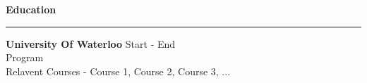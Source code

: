 

\textbf{Education}

\par\noindent\rule{\textwidth}{0.2pt}


\textbf{University Of Waterloo} \hfill {Start - End} \\
{Program} \\
{Relavent Courses} - {Course 1, Course 2, Course 3, ...} \\
